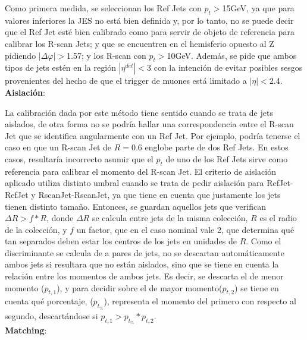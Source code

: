 Como primera medida, se seleccionan los Ref Jets con $p_t>$15GeV, ya que para valores inferiores la JES no está bien definida y, por lo tanto, no se puede decir que el Ref Jet esté bien calibrado como para servir de objeto de referencia para calibrar los R-scan Jets; y que se encuentren en el hemisferio opuesto al Z pidiendo $|\Delta \varphi|>$1.57; y los R-scan con $p_t>$10GeV. Además, se pide que ambos tipos de jets estén en la región $|\eta^{det}|<$3 con la intención de evitar posibles sesgos provenientes del hecho de que el trigger de muones está limitado a $|\eta|<$2.4.\\


\noindent \textbf{Aislación}:

\indent La calibración dada por este método tiene sentido cuando se trata de jets aislados, de otra forma no se podría hallar una correspondencia entre el R-scan Jet que se identifica angularmente con un Ref Jet. Por ejemplo, podría tenerse el caso en que un R-scan Jet de $R=$0.6 englobe parte de dos Ref Jets. En estos casos, resultaría incorrecto asumir que el $p_t$ de uno de los Ref Jets sirve como referencia para calibrar el momento del R-scan Jet. El criterio de aislación aplicado utiliza distinto umbral cuando se trata de pedir aislación para RefJet-RefJet y RscanJet-RscanJet, ya que tiene en cuenta que justamente los jets tienen distinto tamaño. Entonces, se guardan aquellos jets que verifican $\Delta R >f*R$, donde $\Delta R$ se calcula entre jets de la misma colección, $R$ es el radio de la colección, y $f$ un factor, que en el caso nominal vale 2, que determina qué tan separados deben estar los centros de los jets en  unidades de $R$. Como el discriminante se calcula de a pares de jets, no se descartan automáticamente ambos jets si resultara que no están aislados, sino que se tiene en cuenta la relación entre los momentos de ambos jets. Es decir, se descarta el de menor momento ($p_{t,1}$), y para decidir sobre el de mayor momento($p_{t,2}$) se tiene en cuenta qué porcentaje, ($p_{t_{\%}}$), representa el momento del primero con respecto al segundo, descartándose si $p_{t,1}> p_{t_{\%}}*p_{t,2}$. \\

\noindent \textbf{Matching}:

